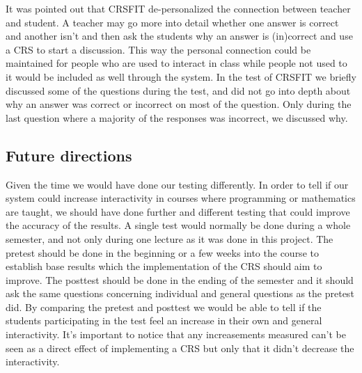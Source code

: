 It was pointed out that CRSFIT de-personalized the connection between teacher and student. A teacher may go more into detail whether one answer is correct and another isn't and then ask the students why an answer is (in)correct and use a CRS to start a discussion. This way the personal connection could be maintained for people who are used to interact in class while people not used to it would be included as well through the system. In the test of CRSFIT we briefly discussed some of the questions during the test, and did not go into depth about why an answer was correct or incorrect on most of the question. Only during the last question where a majority of the responses was incorrect, we discussed why.






\subsection{Future directions}
Given the time we would have done our testing differently. In order to tell if our system could increase interactivity in courses where programming or mathematics are taught, we should have done further and different testing that could improve the accuracy of the results. A single test would normally be done during a whole semester, and not only during one lecture as it was done in this project. The pretest should be done in the beginning or a few weeks into the course to establish base results which the implementation of the CRS should aim to improve. The posttest should be done in the ending of the semester and it should ask the same questions concerning individual and general questions as the pretest did. By comparing the pretest and posttest we would be able to tell if the students participating in the test feel an increase in their own and general interactivity. It's important to notice that any increasements measured can't be seen as a direct effect of implementing a CRS but only that it didn't decrease the interactivity.

